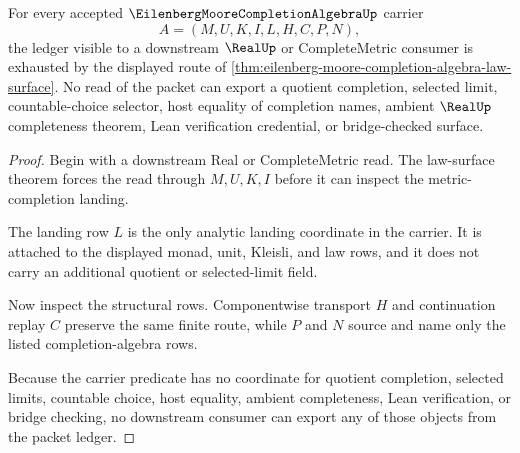 \begin{theorem}
\label{thm:eilenberg-moore-completion-algebra-ledger-nonescape}
For every accepted $\EilenbergMooreCompletionAlgebraUp$ carrier
$$
A=(M,U,K,I,L,H,C,P,N),
$$
the ledger visible to a downstream $\RealUp$ or CompleteMetric consumer is exhausted by the displayed route of \autoref{thm:eilenberg-moore-completion-algebra-law-surface}. No read of the packet can export a quotient completion, selected limit, countable-choice selector, host equality of completion names, ambient $\RealUp$ completeness theorem, Lean verification credential, or bridge-checked surface.
\end{theorem}
\begin{proof}
Begin with a downstream Real or CompleteMetric read. The law-surface theorem forces the read through $M,U,K,I$ before it can inspect the metric-completion landing.

The landing row $L$ is the only analytic landing coordinate in the carrier. It is attached to the displayed monad, unit, Kleisli, and law rows, and it does not carry an additional quotient or selected-limit field.

Now inspect the structural rows. Componentwise transport $H$ and continuation replay $C$ preserve the same finite route, while $P$ and $N$ source and name only the listed completion-algebra rows.

Because the carrier predicate has no coordinate for quotient completion, selected limits, countable choice, host equality, ambient completeness, Lean verification, or bridge checking, no downstream consumer can export any of those objects from the packet ledger.
\end{proof}


\begin{closurestatus}{\EilenbergMooreCompletionAlgebraUp}
  \theoryclosure{\seedClosure}
  \formalstatus{\unformalizedV}
\end{closurestatus}
